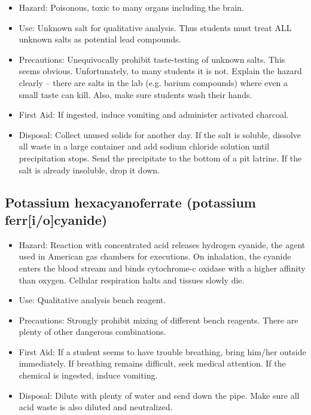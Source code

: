 \begin{itemize}

\item{Hazard: Poisonous, toxic to many organs including the brain.}

\item{Use: Unknown salt for qualitative analysis. 
Thus students must treat ALL unknown salts as potential lead compounds.}

\item{Precautions: Unequivocally prohibit taste-testing of unknown salts. 
This seems obvious. 
Unfortunately, to many students it is not. 
Explain the hazard clearly -- 
there are salts in the lab (e.g. barium compounds) 
where even a small taste can kill. 
Also, make sure students wash their hands.}

\item{First Aid: If ingested, 
induce vomiting and administer activated charcoal.}

\item{Disposal: Collect unused solids for another day. 
If the salt is soluble, 
dissolve all waste in a large container 
and add sodium chloride solution until precipitation stops. 
Send the precipitate to the bottom of a pit latrine. 
If the salt is already insoluble, drop it down.}

\end{itemize}

\subsection{Potassium hexacyanoferrate (potassium ferr[i/o]cyanide)}

\begin{itemize}

\item{Hazard: Reaction with concentrated acid releases hydrogen cyanide, 
the agent used in American gas chambers for executions. 
On inhalation, the cyanide enters the blood stream 
and binds cytochrome-c oxidase with a higher affinity than oxygen. 
Cellular respiration halts and tissues slowly die.}

\item{Use: Qualitative analysis bench reagent.}

\item{Precautions: Strongly prohibit mixing of different bench reagents. 
There are plenty of other dangerous combinations.}

\item{First Aid: If a student seems to have trouble breathing, 
bring him/her outside immediately. 
If breathing remains difficult, seek medical attention. 
If the chemical is ingested, induce vomiting.}

\item{Disposal: Dilute with plenty of water and send down the pipe. 
Make sure all acid waste is also diluted and neutralized.}

\end{itemize}

